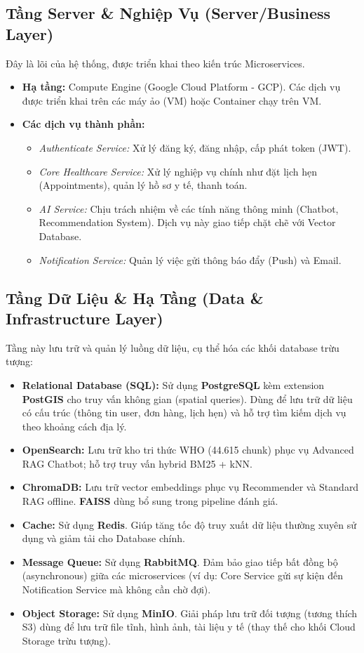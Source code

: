 \subsection*{Tầng Server \& Nghiệp Vụ (Server/Business Layer)}
Đây là lõi của hệ thống, được triển khai theo kiến trúc Microservices.

\begin{itemize}
    \item \textbf{Hạ tầng:} Compute Engine (Google Cloud Platform - GCP). Các dịch vụ được triển khai trên các máy ảo (VM) hoặc Container chạy trên VM.
    \item \textbf{Các dịch vụ thành phần:}
    \begin{itemize}
        \item \textit{Authenticate Service:} Xử lý đăng ký, đăng nhập, cấp phát token (JWT).
        \item \textit{Core Healthcare Service:} Xử lý nghiệp vụ chính như đặt lịch hẹn (Appointments), quản lý hồ sơ y tế, thanh toán.
        \item \textit{AI Service:} Chịu trách nhiệm về các tính năng thông minh (Chatbot, Recommendation System). Dịch vụ này giao tiếp chặt chẽ với Vector Database.
        \item \textit{Notification Service:} Quản lý việc gửi thông báo đẩy (Push) và Email.
    \end{itemize}
\end{itemize}

\subsection*{Tầng Dữ Liệu \& Hạ Tầng (Data \& Infrastructure Layer)}
Tầng này lưu trữ và quản lý luồng dữ liệu, cụ thể hóa các khối database trừu tượng:

\begin{itemize}
    \item \textbf{Relational Database (SQL):} Sử dụng \textbf{PostgreSQL} kèm extension \textbf{PostGIS} cho truy vấn không gian (spatial queries). Dùng để lưu trữ dữ liệu có cấu trúc (thông tin user, đơn hàng, lịch hẹn) và hỗ trợ tìm kiếm dịch vụ theo khoảng cách địa lý.
    \item \textbf{OpenSearch:} Lưu trữ kho tri thức WHO (44.615 chunk) phục vụ Advanced RAG Chatbot; hỗ trợ truy vấn hybrid BM25 + kNN.
    \item \textbf{ChromaDB:} Lưu trữ vector embeddings phục vụ Recommender và Standard RAG offline. \textbf{FAISS} dùng bổ sung trong pipeline đánh giá.
    \item \textbf{Cache:} Sử dụng \textbf{Redis}. Giúp tăng tốc độ truy xuất dữ liệu thường xuyên sử dụng và giảm tải cho Database chính.
    \item \textbf{Message Queue:} Sử dụng \textbf{RabbitMQ}. Đảm bảo giao tiếp bất đồng bộ (asynchronous) giữa các microservices (ví dụ: Core Service gửi sự kiện đến Notification Service mà không cần chờ đợi).
    \item \textbf{Object Storage:} Sử dụng \textbf{MinIO}. Giải pháp lưu trữ đối tượng (tương thích S3) dùng để lưu trữ file tĩnh, hình ảnh, tài liệu y tế (thay thế cho khối Cloud Storage trừu tượng).
\end{itemize}

